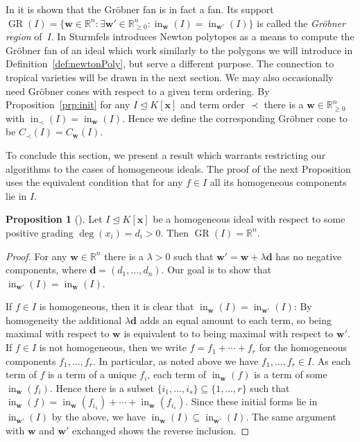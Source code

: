 \documentclass[
  paper=a4,
  titlepage,
  bibliography=totoc,
  listof=totoc,
  pagesize=pdftex
]{scrartcl}
\numberwithin{figure}{section}
\numberwithin{equation}{section}
\numberwithin{table}{section}
\newcommand*\setR{\mathds{R}}
\let\vec\mathbf
\let\idealof\trianglelefteq
\DeclareMathOperator{\initial}{in}
\DeclareMathOperator{\GR}{GR}
\theoremstyle{definition}
\newtheorem{proposition}[definition]{Proposition}
\numberwithin{definition}{section}
\begin{document}
In \cite[Theorem~2.19]{compGrobFan} it is shown that the Gröbner fan is in fact a fan. Its
support $\GR(I) = \{ \vec w \in \setR^n : \exists \vec w' \in \setR^n_{\geq0} :
\initial_{\vec w}(I) = \initial_{\vec w'}(I)\}$ is called the \emph{Gröbner region}
of~$I$. In \cite{SturmGBCP} Sturmfels introduces Newton polytopes as a means to compute
the Gröbner fan of an ideal which work similarly to the polygons we will introduce in
Definition~\ref{def:newtonPoly}, but serve a different purpose. The connection to tropical
varieties will be drawn in the next section. We may also occasionally need Gröbner cones
with respect to a given term ordering. By Proposition~\ref{prp:init} for any $I \idealof
K[\vec x]$ and term order $\prec$ there is a $\vec w \in \setR^n_{\geq0}$ with
$\initial_\prec(I) = \initial_{\vec w}(I)$. Hence we define the corresponding Gröbner cone
to be $C_\prec(I) = C_{\vec w}(I)$.

To conclude this section, we present a result which warrants restricting our algorithms to
the cases of homogeneous ideals. The proof of the next Proposition uses the equivalent
condition that for any $f \in I$ all its homogeneous components lie in $I$.

\begin{proposition}[{\cite[Proposition~1.12]{SturmGBCP}}]
  \label{prp:grRegion}
  Let $I \idealof K[\vec x]$ be a homogeneous ideal with respect to some positive grading
  $\deg(x_i) = d_i > 0$. Then $\GR(I) = \setR^n$.
  \begin{proof}
    For any $\vec w \in \setR^n$ there is a $\lambda > 0$ such that $\vec w' = \vec w +
    \lambda \vec d$ has no negative components, where $\vec d = (d_1, \dots, d_n)$. Our
    goal is to show that $\initial_{\vec w'}(I) = \initial_{\vec w}(I)$.

    If $f \in I$ is homogeneous, then it is clear that $\initial_{\vec w}(I) =
    \initial_{\vec w'}(I)$: By homogeneity the additional $\lambda \vec d$ adds an equal
    amount to each term, so being maximal with respect to $\vec w$ is equivalent to to
    being maximal with respect to $\vec w'$. If $f \in I$ is not homogeneous, then we
    write $f = f_1 + \cdots + f_r$ for the homogeneous components $f_1,\dots,f_r$. In
    particular, as noted above we have $f_1, \dots, f_r \in I$. As each term of $f$ is a
    term of a unique $f_i$, each term of $\initial_{\vec w}(f)$ is a term of some
    $\initial_{\vec w}(f_i)$. Hence there is a subset $\{i_1, \dots, i_s\} \subseteq \{1,
    \dots, r\}$ such that $\initial_{\vec w}(f) = \initial_{\vec w}(f_{i_1}) + \cdots +
    \initial_{\vec w}(f_{i_s})$. Since these initial forms lie in $\initial_{\vec w'}(I)$
    by the above, we have $\initial_{\vec w}(I) \subseteq \initial_{\vec w'}(I)$. The same
    argument with $\vec w$ and $\vec w'$ exchanged shows the reverse inclusion.
  \end{proof}
\end{proposition}
\end{document}

